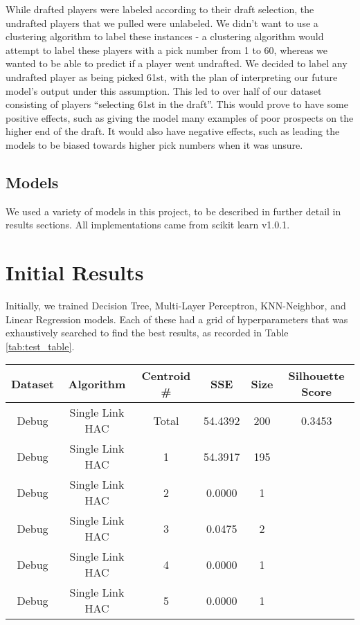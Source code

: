 \documentclass{article}
\begin{document}
While drafted players were labeled according to their draft selection, the
undrafted players that we pulled were unlabeled. We didn’t want to use a
clustering algorithm to label these instances - a clustering algorithm would
attempt to label these players with a pick number from 1 to 60, whereas we
wanted to be able to predict if a player went undrafted. We decided to label any
undrafted player as being picked 61st, with the plan of interpreting our future
model’s output under this assumption. This led to over half of our dataset
consisting of players “selecting 61st in the draft”. This would prove to have
some positive effects, such as giving the model many examples of poor prospects
on the higher end of the draft. It would also have negative effects, such as
leading the models to be biased towards higher pick numbers when it was unsure. 

\subsection{Models}

We used a variety of models in this project, to be described in further detail
in results sections. All implementations came from scikit learn v1.0.1.

\section{Initial Results}

Initially, we trained Decision Tree, Multi-Layer Perceptron, KNN-Neighbor, and
Linear Regression models. Each of these had a grid of hyperparameters that was
exhaustively searched to find the best results, as recorded in Table
\ref{tab:test_table}.

\begin{table*}
	\begin{center}
		\begin{tabular}{||c c c c c c||} 
		\hline\hline
		Dataset & Algorithm & Centroid \# & SSE & Size & Silhouette Score \\ 
		\hline\hline
		Debug & Single Link HAC & Total & 54.4392 & 200 & 0.3453 \\ \hline
		Debug & Single Link HAC & 1 & 54.3917 & 195 & \\ \hline
		Debug & Single Link HAC & 2 & 0.0000 & 1 & \\ \hline
		Debug & Single Link HAC & 3 & 0.0475 & 2 & \\ \hline
		Debug & Single Link HAC & 4 & 0.0000 & 1 & \\ \hline
		Debug & Single Link HAC & 5 & 0.0000 & 1 & \\ \hline
		\hline\hline
		\end{tabular}
	\end{center}
	\caption{Test table}
	\label{tab:test_table}
\end{table*}
\end{document}
